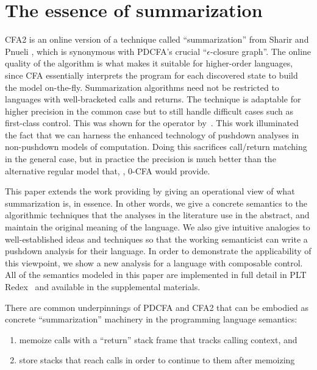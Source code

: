 \section{The essence of summarization}

CFA2 is an online version of a technique called ``summarization'' from Sharir and Pnueli \citep[Chapter 7]{local:muchnick:jones:flow-analysis:1981}, which is synonymous with PDCFA's crucial ``$\epsilon$-closure graph''.
%
The online quality of the algorithm is what makes it suitable for higher-order languages, since CFA essentially interprets the program for each discovered state to build the model on-the-fly.
%
Summarization algorithms need not be restricted to languages with well-bracketed calls and returns.
%
The technique is adaptable for higher precision in the common case but to still handle difficult cases such as first-class control.
%
This was shown for the  operator by~\citet{ianjohnson:Vardoulakis2011Pushdown}.
%
This work illuminated the fact that we can harness the enhanced technology of pushdown analyses in non-pushdown models of computation.
%
Doing this sacrifices call/return matching in the general case, but in practice the precision is much better than the alternative regular model that, \eg, 0-CFA would provide.

This paper extends the work providing  by giving an operational view of what summarization is, in essence.
%
In other words, we give a concrete semantics to the algorithmic techniques that the analyses in the literature use in the abstract, and maintain the original meaning of the language.
%
We also give intuitive analogies to well-established ideas and techniques so that the working semanticist can write a pushdown analysis for their language.
%
In order to demonstrate the applicability of this viewpoint, we show a new analysis for a language with composable control.
%
All of the semantics modeled in this paper are implemented in full detail in PLT Redex~\citep{ianjohnson:Felleisen:2009:SEP:1795772} and available in the supplemental materials.

There are common underpinnings of PDCFA and CFA2 that can be embodied as concrete ``summarization'' machinery in the programming language semantics: 
\begin{enumerate}
\item{memoize calls with a ``return'' stack frame that tracks calling context, and}
\item{store stacks that reach calls in order to continue to them after memoizing}
\end{enumerate}

